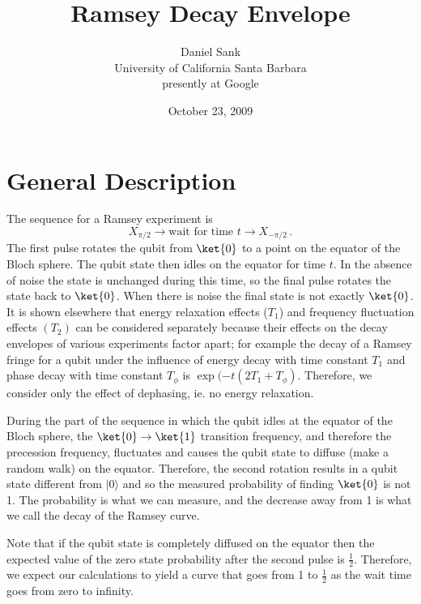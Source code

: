 \documentclass{article}
\begin{document}
\title{Ramsey Decay Envelope}
\author{Daniel Sank\\University of California Santa Barbara\\presently at Google}
\date{October 23, 2009}

\maketitle


\section{General Description}

The sequence for a Ramsey experiment is
\begin{equation}
X_{\pi/2}\rightarrow\textrm{wait for time }t\rightarrow X_{-\pi/2} \, .
\end{equation}
The first pulse rotates the qubit from $\ket{0}$ to a point on the equator of the Bloch sphere.
The qubit state then idles on the equator for time $t$.
In the absence of noise the state is unchanged during this time, so the final pulse rotates the state back to $\ket{0}$.
When there is noise the final state is not exactly $\ket{0}$.
It is shown elsewhere that energy relaxation effects ($T_1$) and frequency fluctuation effects $(T_2)$ can be considered separately because their effects on the decay envelopes of various experiments factor apart; for example the decay of a Ramsey fringe for a qubit under the influence of energy decay with time constant $T_1$ and phase decay with time constant $T_\phi$ is $\exp(-t(2T_1 + T_\phi)$.
Therefore, we consider only the effect of dephasing, ie. no energy relaxation.

During the part of the sequence in which the qubit idles at the equator of the Bloch sphere, the $\ket{0}\rightarrow\ket{1}$ transition frequency, and therefore the precession frequency, fluctuates and causes the qubit state to diffuse (make a random walk)
on the equator.
Therefore, the second rotation results in a qubit state different from $|0\rangle$ and so the measured probability of finding $\ket{0}$ is not 1.
The probability is what we can measure, and the decrease away from 1 is what we call the decay of the Ramsey curve.

Note that if the qubit state is completely diffused on the equator then the expected value of the zero state probability after the second pulse is $\frac{1}{2}$.
Therefore, we expect our calculations to yield a curve that goes from 1 to $\frac{1}{2}$ as the wait time goes from zero to infinity.
\end{document}
